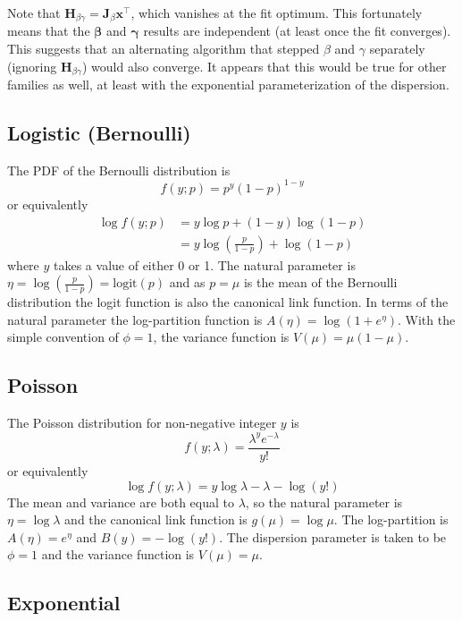 \documentclass{article}
\begin{document}
Note that \(\mathbf{H}_{\beta\gamma} = \mathbf{J}_\beta \mathbf{x}^\intercal
\), which vanishes at the fit optimum. This fortunately means that
the \(\boldsymbol\beta\) and \(\boldsymbol\gamma\) results are independent (at
least once the fit converges). This suggests that an alternating algorithm that
stepped \(\beta\) and \(\gamma\) separately (ignoring
\(\mathbf{H}_{\beta\gamma}\)) would also converge. It appears that this would
be true for other families as well, at least with the exponential
parameterization of the dispersion.

\subsection{Logistic (Bernoulli)}

The PDF of the Bernoulli distribution is
\[ f(y; p) = p^y (1-p)^{1-y} \]
or equivalently
\begin{align}
\log f(y; p) &= y \log p + (1-y) \log(1-p) \\\
&= y \log\left(\frac{p}{1-p}\right) + \log(1-p)
\end{align}
where \(y\) takes a value of either 0 or 1.
The natural parameter is \(\eta = \log\left(\frac{p}{1-p}\right) =
\textrm{logit}(p) \) and as \(p = \mu\) is the mean of the Bernoulli
distribution the logit function is also the canonical link function.
In terms of the natural parameter the log-partition function is \(A(\eta) =
\log\left(1 + e^\eta \right)\).
With the simple convention of \(\phi=1\), the variance function is \(V(\mu) =
\mu(1-\mu)\).


\subsection{Poisson}

The Poisson distribution for non-negative integer \(y\) is
\[ f(y; \lambda) = \frac{\lambda^y e^{-\lambda}}{y!} \]
or equivalently
\[ \log f(y; \lambda) = y \log \lambda - \lambda - \log(y!) \]
The mean and variance are both equal to \(\lambda\), so the natural parameter
is \(\eta = \log \lambda\) and the canonical link function is \(g(\mu) = \log
\mu \).
The log-partition is \(A(\eta) = e^\eta \) and \(B(y) = -\log(y!)\).
The dispersion parameter is taken to be \(\phi = 1\) and the variance function
is \(V(\mu) = \mu\).


\subsection{Exponential}
\end{document}
